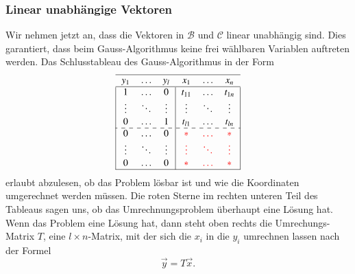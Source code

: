 \subsubsection{Linear unabhängige Vektoren}
Wir nehmen jetzt an, dass die Vektoren in $\mathcal{B}$ und
$\mathcal{C}$ linear unabhängig sind. 
Dies garantiert, dass beim Gauss-Algorithmus keine frei wählbaren Variablen
auftreten werden.
Das Schlusstableau des Gauss-Algorithmus in der Form
\[
\begin{tabular}{|>{$}c<{$}>{$}c<{$}>{$}c<{$}|>{$}c<{$}>{$}c<{$}>{$}c<{$}|}
\hline
   y_1&\dots &   y_l&   x_1&\dots &   x_n\\
\hline
1&\dots &0&t_{11}&\dots &t_{1n}\\
\vdots&\ddots&\vdots&\vdots&\ddots&\vdots\\
0&\dots &1&t_{l1}&\dots &t_{ln}\\
\hdashline
  0   &\dots &  0   &\color{red}*&\color{red}\dots&\color{red}*\\
\vdots&\ddots&\vdots&\color{red}\vdots&\color{red}\ddots&\color{red}\vdots\\
  0   &\dots &  0   &\color{red}*&\color{red}\dots&\color{red}*\\
\hline
\end{tabular}
\]
erlaubt abzulesen, ob das Problem lösbar ist und wie die Koordinaten
umgerechnet werden müssen.
Die {\color{red}roten} Sterne im rechten unteren Teil des Tableaus sagen uns,
ob das Umrechnungsproblem überhaupt eine Lösung hat.
Wenn das Problem eine Lösung hat, dann steht oben rechts die Umrechungs-Matrix
$T$, eine $l\times n$-Matrix, mit der sich die $x_i$ in die $y_i$ umrechnen
lassen
nach der Formel
\[
\vec{y} = T\vec{x}.
\]

